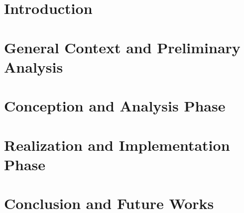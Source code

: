 \documentclass[12pt,a4paper]{report}
\begin{document}


\clearpage
{}
\setcounter{page}{1}
\tableofcontents
\clearpage
{}
{}
\listoffigures
\clearpage
{}
{}
\listoftables
\clearpage

\setcounter{page}{1}

\chapter*{Introduction}


\chapter{General Context and Preliminary Analysis}


\chapter{Conception and Analysis Phase}


\chapter{Realization and Implementation Phase}


\chapter*{Conclusion and Future Works}




\clearpage
{}
{}





\end{document}
